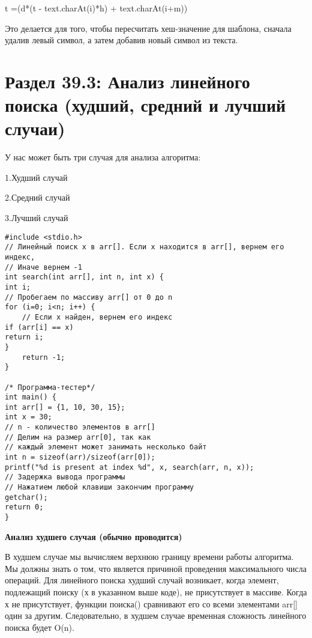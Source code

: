 \vspace{\baselineskip}
t =(d*(t - text.charAt(i)*h) + text.charAt(i+m))%

\vspace{\baselineskip}
Это делается для того, чтобы пересчитать хеш-значение для шаблона, сначала удалив левый символ, а затем добавив новый символ из текста.

\vspace{\baselineskip}
\section*{Раздел 39.3: Анализ линейного поиска (худший, средний и лучший случаи)}

\vspace{\baselineskip}
У нас может быть три случая для анализа алгоритма: 

\vspace{\baselineskip}
1.Худший случай 

\vspace{\baselineskip}
2.Средний случай

\vspace{\baselineskip}
3.Лучший случай

\vspace{\baselineskip}
\begin{verbatim} 
#include <stdio.h>
// Линейный поиск x в arr[]. Если x находится в arr[], вернем его индекс,
// Иначе вернем -1
int search(int arr[], int n, int x) {
int i;
// Пробегаем по массиву arr[] от 0 до n
for (i=0; i<n; i++) {
	// Если x найден, вернем его индекс
if (arr[i] == x)
return i;
}
	return -1;
}

/* Программа-тестер*/
int main() {
int arr[] = {1, 10, 30, 15};
int x = 30;
// n - количество элементов в arr[]
// Делим на размер arr[0], так как
// каждый элемент может занимать несколько байт
int n = sizeof(arr)/sizeof(arr[0]);
printf("%d is present at index %d", x, search(arr, n, x));
// Задержка вывода программы
// Нажатием любой клавиши закончим программу
getchar();
return 0;
}
\end{verbatim}


\newpage

\textbf{Анализ худшего случая (обычно проводится)} 

\vspace{\baselineskip}

В худшем случае мы вычисляем верхнюю границу времени работы алгоритма. Мы должны знать о том, что является причиной проведения максимального числа операций. Для линейного поиска худший случай возникает, когда элемент, подлежащий поиску (х в указанном выше коде), не присутствует в массиве. Когда х не присутствует, функции поиска() сравнивают его со всеми элементами arr[] один за другим. Следовательно, в худшем случае временная сложность линейного поиска будет O(n).

